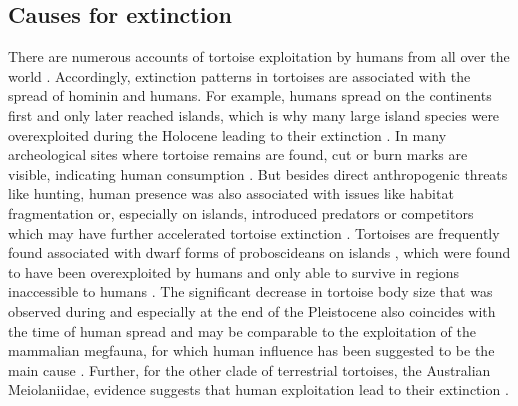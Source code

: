 
%

\subsection{Causes for extinction}
There are numerous accounts of tortoise exploitation by humans from all over the world \citep{Blasco2008,Blasco2011,Blasco2016,Pritchard2013,Speth2002,Thompson2014,Steadman2017,Franz2001a,Avery2004,Karl2012,Archer2014,Mudar2007,Munro2010,Peres2006,Sampson1998,Sampson2000}. Accordingly, extinction patterns in tortoises are associated with the spread of hominin and humans. For example, humans spread on the continents first and only later reached islands, which is why many large island species were overexploited during the Holocene leading to their extinction \citep{Rhodin2015}. 
In many archeological sites where tortoise remains are found, cut or burn marks are visible, indicating human consumption \citep{Archer2014,Biton2017,Blasco2008,Blasco2016,Munro2010}. But besides direct anthropogenic threats like hunting, human presence was also associated with issues like habitat fragmentation or, especially on islands, introduced predators or competitors which may have further accelerated tortoise extinction \citep{Sterli2015}. 
Tortoises are frequently found associated with dwarf forms of proboscideans on islands \citep{Hooijer1951,Vlachos2014}, which were found to have been overexploited by humans and only able to survive in regions inaccessible to humans \citep{Surovell2005}.
The significant decrease in tortoise body size that was observed during and especially at the end of the Pleistocene also coincides with the time of human spread and may be comparable to the exploitation of the mammalian megfauna, for which human influence has been suggested to be the main cause \citep{Barnosky2004, Sandom2014}.
Further, for the other clade of terrestrial tortoises, the Australian Meiolaniidae, evidence suggests that human exploitation lead to their extinction \citep{White2010}.
